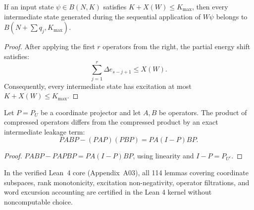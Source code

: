 \begin{theorem}
\label{thm:app_word_safety}
If an input state $\psi \in B(N, K)$ satisfies $K + X(W) \le K_{\max}$, then every intermediate state generated during the sequential application of $W \psi$ belongs to $B(N + \sum q_j, K_{\max})$.
\end{theorem}

\begin{proof}
After applying the first $r$ operators from the right, the partial energy shift satisfies:
\begin{equation}
\sum_{j=1}^r \Delta e_{s-j+1} \le X(W).
\end{equation}
Consequently, every intermediate state has excitation at most $K + X(W) \le K_{\max}$.
\end{proof}

\begin{proposition}
\label{prop:compression_remainder}
Let $P = P_U$ be a coordinate projector and let $A, B$ be operators. The product of compressed operators differs from the compressed product by an exact intermediate leakage term:
\begin{equation}
P A B P - (P A P)(P B P) = P A (I - P) B P.
\end{equation}
\end{proposition}

\begin{proof}
$P A B P - P A P B P = P A (I - P) B P$, using linearity and $I - P = P_{U^c}$.
\end{proof}

\begin{remark}
In the verified Lean~4 core (Appendix~A03), all 114 lemmas covering coordinate subspaces, rank monotonicity, excitation non-negativity, operator filtrations, and word excursion accounting are certified in the Lean 4 kernel without noncomputable choice.
\end{remark}
